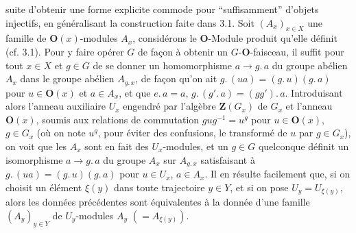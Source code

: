 \clearpage
{}

suite d'obtenir une forme explicite commode pour ``suffisamment'' d'objets
injectifs, en généralisant la construction faite dans 3.1.
Soit $(A_x)_{x\in X}$ une famille de ${\mathbf O}(x)$-modules $A_x$, considérons le
${\mathbf O}$-Module produit qu'elle définit (cf. 3.1). Pour y faire opérer $G$ de façon
à obtenir un $G$-${\mathbf O}$-faisceau, il suffit pour tout $x\in X$ et $g\in G$ de se
donner un homomorphisme $a\to g.\,a$ du groupe abélien
$A_x$ dans le groupe abélien $A_{g.\, x}$, de façon qu'on ait $g.\,(ua)=(g.\,u)(g.\,a)$ pour $u\in {\mathbf O}(x)$ et $a\in A_x$, et que $e.\,a=a$, $g.\,(g'.\,a)=(gg').\,a$.
Introduisant alors l'anneau auxiliaire $U_x$ engendré par l'algèbre
$\mathbf Z(G_x)$ de $G_x$ et l'anneau ${\mathbf O}(x)$, soumis aux relations de
commutation $gug^{-1}=u^g$ pour $u\in {\mathbf O}(x)$, $g\in G_x$
(où on note $u^g$, pour éviter des confusions, le transformé de $u$ par
$g\in G_x$), on voit que les $A_x$ sont en fait des $U_x$-modules, et un
$g\in G$ quelconque définit un isomorphisme
$a\to g.\,a$ du groupe $A_x$ sur $A_{g.\, x}$
satisfaisant à $g.\,(ua)=(g.\,u)(g.\,a)$ pour $u\in U_x$, $a\in A_x$.
Il en résulte facilement que, si on choisit un élément $\xi(y)$ dans toute
trajectoire $y\in Y$, et si on pose $U_y=U_{\xi(y)}$, alors les données
précédentes sont équivalentes à la donnée d'une famille $(A_y)_{y\in Y}$ de
$U_y$-modules $A_y$ $(=A_{\xi(y)})$.

